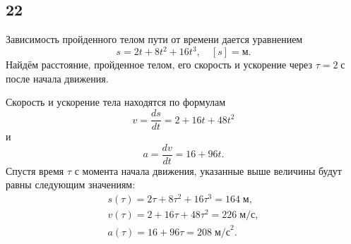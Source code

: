 \subsection{22}

Зависимость пройденного телом пути от времени дается уравнением
\[
s=2t+8t^2+16t^3,\quad[s]=\text{м}.
\]
Найдём расстояние, пройденное телом, его скорость и ускорение через $\tau=2\;\text{с}$ после начала движения.

Скорость и ускорение тела находятся по формулам
\[
v=\frac{ds}{dt}=2+16t+48t^2
\]
и
\[
a=\frac{dv}{dt}=16+96t.
\]
Спустя время $\tau$ с момента начала движения, указанные выше величины будут равны следующим значениям:
\begin{gather*}
s(\tau)=2\tau+8\tau^2+16\tau^3=164\;\text{м}, \\
v(\tau)=2+16\tau+48\tau^2=226\;\text{м/с}, \\
a(\tau)=16+96\tau=208\;\text{м/с}^2.
\end{gather*}
